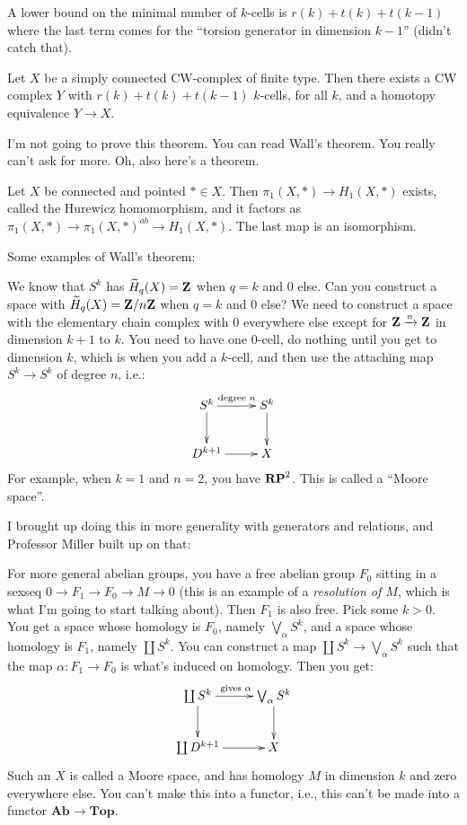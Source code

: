 A lower bound on the minimal number of $k$-cells is $r(k)+t(k)+t(k-1)$ where the last term comes for the ``torsion generator in dimension $k-1$'' (didn't catch that).
\begin{theorem}[Wall]
Let $X$ be a simply connected CW-complex of finite type. Then there exists a CW complex $Y$ with $r(k)+t(k)+t(k-1)$ $k$-cells, for all $k$, and a homotopy equivalence $Y\to X$.
\end{theorem}
I'm not going to prove this theorem. You can read Wall's theorem. You really can't ask for more. Oh, also here's a theorem.
\begin{theorem}
Let $X$ be connected and pointed $\ast\in X$. Then $\pi_1(X,\ast)\to H_1(X,\ast)$ exists, called the Hurewicz homomorphism, and it factors as $\pi_1(X,\ast)\to \pi_1(X,\ast)^{ab}\to H_1(X,\ast)$. The last map is an isomorphism.
\end{theorem}
Some examples of Wall's theorem:
\begin{example}
We know that $S^k$ has $\widetilde{ H}_q(X)=\mathbf Z$ when $q=k$ and $0$ else. Can you construct a space with $\widetilde{ H}_q(X)=\mathbf Z/n\mathbf Z$ when $q=k$ and $0$ else? We need to construct a space with the elementary chain complex with $0$ everywhere else except for $\mathbf Z\xrightarrow{n}\mathbf Z$ in dimension $k+1$ to $k$. You need to have one $0$-cell, do nothing until you get to dimension $k$, which is when you add a $k$-cell, and then use the attaching map $S^k\to S^k$ of degree $n$, i.e.:
\begin{equation*}
\xymatrix{S^k\ar[r]^{\text{degree }n}\ar[d] & S^k\ar[d]\\
D^{k+1}\ar[r] & X}
\end{equation*}
For example, when $k=1$ and $n=2$, you have $\mathbf{RP}^2$. This is called a ``Moore space''.
\end{example}
I brought up doing this in more generality with generators and relations, and Professor Miller built up on that:
\begin{example}
For more general abelian groups, you have a free abelian group $F_0$ sitting in a sexseq $0\to F_1\to F_0\to M\to 0$ (this is an example of a \emph{resolution of $M$}, which is what I'm going to start talking about). Then $F_1$ is also free. Pick some $k>0$. You get a space whose homology is $F_0$, namely $\bigvee_\alpha S^k$, and a space whose homology is $F_1$, namely $\coprod S^k$. You can construct a map $\coprod S^k\to \bigvee_\alpha S^k$ such that the map $\alpha:F_1\to F_0$ is what's induced on homology. Then you get:
\begin{equation*}
\xymatrix{\coprod S^k\ar[r]^{\text{gives }\alpha}\ar[d] & \bigvee_\alpha S^k\ar[d]\\
\coprod D^{k+1}\ar[r] & X}
\end{equation*}
Such an $X$ is called a Moore space, and has homology $M$ in dimension $k$ and zero everywhere else. You can't make this into a functor, i.e., this can't be made into a functor $\mathbf{Ab}\to\mathbf{Top}$.
\end{example}
